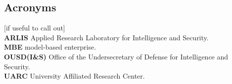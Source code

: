 \documentclass[letterpaper, 10pt]{article}
\begin{document}
\begin{multicols}{2}
    \section{Acronyms}
        [if useful to call out] \\
        \textbf{ARLIS} Applied Research Laboratory for Intelligence and Security.\\ 
        \textbf{MBE} model-based enterprise. \\
        \textbf{OUSD(I\&S)} Office of the Undersecretary of Defense for  Intelligence and Security. \\
        \textbf{UARC} University Affiliated Research Center.\\
    \end{multicols}
    \newpage
\end{document}
